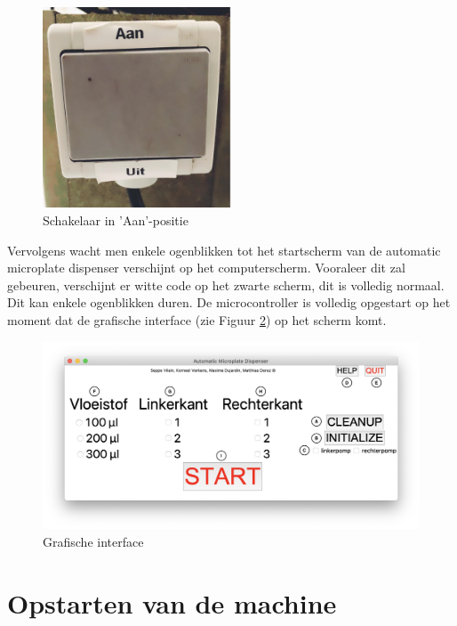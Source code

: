 \documentclass[a4paper,twoside,kulak]{kulakreport} %
\begin{document}
\begin{figure}[h]
	\centering
	\includegraphics[width=0.5\textwidth]{schakelaar.png}
	\caption{Schakelaar in 'Aan'-positie}
	\label{fig:schakelaar}
	
\end{figure} 
Vervolgens wacht men enkele ogenblikken tot het startscherm van de automatic microplate dispenser verschijnt op het computerscherm. Vooraleer dit zal gebeuren, verschijnt er witte code op het zwarte scherm, dit is volledig normaal. Dit kan enkele ogenblikken duren. De microcontroller is volledig opgestart op het moment dat de grafische interface (zie Figuur \ref{fig: GI_letters1}) op het scherm komt.
 
\begin{figure}[h]
	\centering
	\includegraphics[width=1\textwidth]{GI_letters.png}
	\caption{Grafische interface}
	\label{fig: GI_letters1}
	
\end{figure} 

\section*{Opstarten van de machine}
\label{sec:initialize}
\end{document}
